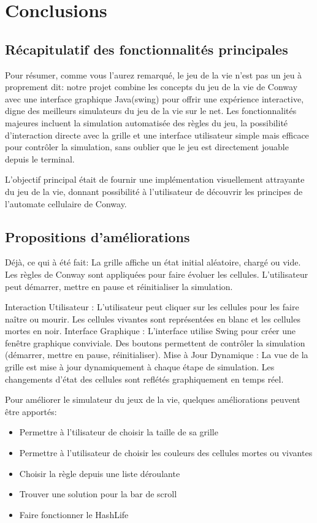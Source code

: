 \section{Conclusions}
\label{ch:con}
\subsection{Récapitulatif des fonctionnalités principales}
Pour résumer, comme vous l'aurez remarqué, le jeu de la vie n'est pas un jeu à proprement dit: notre projet combine les concepts du jeu de la vie de Conway avec une interface graphique Java(swing) pour offrir une expérience interactive, digne des meilleurs simulateurs du jeu de la vie sur le net. 
Les fonctionnalités majeures incluent la simulation automatisée des règles du jeu, la possibilité d'interaction directe avec la grille et une interface utilisateur simple mais efficace pour contrôler la simulation, sans oublier que le jeu est directement jouable depuis le terminal.

L'objectif principal était de fournir une implémentation visuellement attrayante du jeu de la vie, donnant possibilité à l'utilisateur de découvrir les principes de l'automate cellulaire de Conway.


\subsection{Propositions d’améliorations}
Déjà, ce qui à été fait: 
La grille affiche un état initial aléatoire, chargé ou vide.
Les règles de Conway sont appliquées pour faire évoluer les cellules.
L'utilisateur peut démarrer, mettre en pause et réinitialiser la simulation.

Interaction Utilisateur :
L'utilisateur peut cliquer sur les cellules pour les faire naître ou mourir.
Les cellules vivantes sont représentées en blanc et les cellules mortes en noir.
Interface Graphique :
L'interface utilise Swing pour créer une fenêtre graphique conviviale.
Des boutons permettent de contrôler la simulation (démarrer, mettre en pause, réinitialiser).
Mise à Jour Dynamique :
La vue de la grille est mise à jour dynamiquement à chaque étape de simulation.
Les changements d'état des cellules sont reflétés graphiquement en temps réel.

    Pour améliorer le simulateur du jeux de la vie, quelques améliorations peuvent être apportés:
    \begin{itemize}
        \item Permettre à l'tilisateur de choisir la taille de sa grille
        \item Permettre à l'utilisateur de choisir les couleurs des cellules mortes ou vivantes
        \item Choisir la règle depuis une liste déroulante
        \item Trouver une solution pour la bar de scroll
        \item Faire fonctionner le HashLife
    \end{itemize}